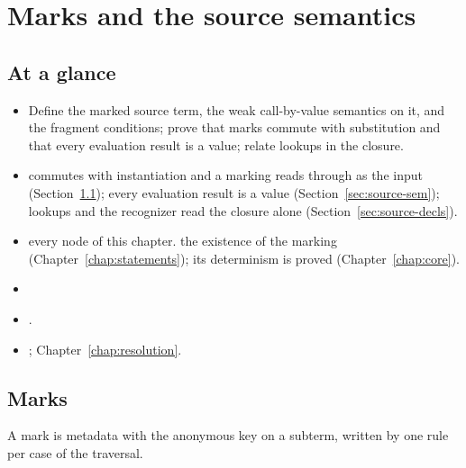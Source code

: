 \chapter{Marks and the source semantics}\label{chap:source}

\section*{At a glance}
\begin{itemize}
\item {} Define the marked source term, the weak call-by-value semantics on it, and the
  fragment conditions; prove that marks commute with substitution and that every evaluation result is a value; relate lookups in the closure.
\item {}  commutes with instantiation and a marking reads through  as the input (Section~\ref{sec:source-marks}); every evaluation result is a value (Section~\ref{sec:source-sem}); lookups and the  recognizer read the closure alone (Section~\ref{sec:source-decls}).
\item {} \stProved{} every node of this chapter. \stOpen{} the existence of the marking (Chapter~\ref{chap:statements}); its determinism is proved (Chapter~\ref{chap:core}).
\item {} 
\item {} .
\item {} ; Chapter~\ref{chap:resolution}.
\end{itemize}

\section{Marks}\label{sec:source-marks}

A mark is metadata with the anonymous key on a subterm, written by  one rule per case of the traversal.

